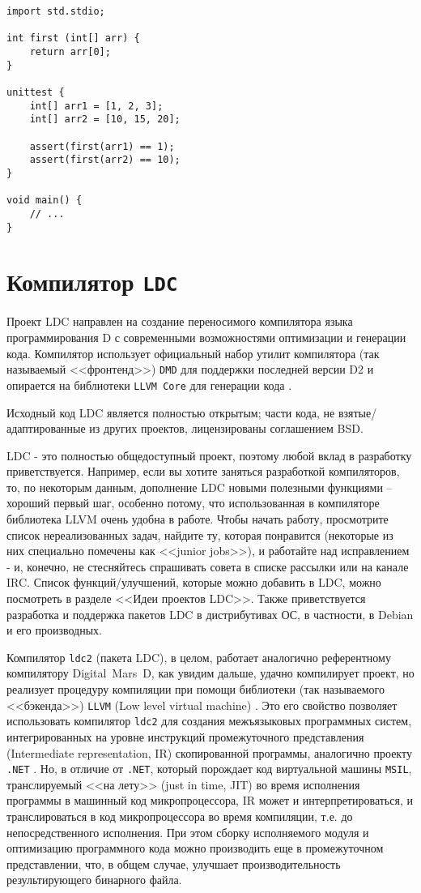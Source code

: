 \documentclass{studrep}
\begin{document}
\begin{verbatim}
import std.stdio;

int first (int[] arr) {
    return arr[0];
}

unittest {
    int[] arr1 = [1, 2, 3];
    int[] arr2 = [10, 15, 20];

    assert(first(arr1) == 1);
    assert(first(arr2) == 10);
}

void main() {
    // ...
}
\end{verbatim}

\section{Компилятор \texttt{LDC}}

Проект LDC направлен на создание переносимого компилятора языка программирования D с современными возможностями оптимизации и генерации кода. Компилятор использует официальный набор утилит компилятора (так называемый <<фронтенд>>) \texttt{DMD} для поддержки последней версии D2 и опирается на библиотеки \texttt{LLVM Core} для генерации кода \cite{ldcwiki}.

Исходный код LDC является полностью открытым; части кода, не взятые/адаптированные из других проектов, лицензированы соглашением BSD.

LDC - это полностью общедоступный проект, поэтому любой вклад в разработку приветствуется. Например, если вы хотите заняться разработкой компиляторов, то, по некоторым данным, дополнение LDC новыми полезными функциями -- хороший первый шаг, особенно потому, что использованная в компиляторе библиотека LLVM очень удобна в работе. Чтобы начать работу, просмотрите список нереализованных задач, найдите ту, которая понравится (некоторые из них специально помечены как <<junior jobs>>), и работайте над исправлением - и, конечно, не стесняйтесь спрашивать совета в списке рассылки или на канале IRC. Список функций/улучшений, которые можно добавить в LDC, можно посмотреть в разделе <<Идеи проектов LDC>>. Также приветствуется разработка и поддержка пакетов LDC в дистрибутивах ОС, в частности, в Debian и его производных.

Компилятор \texttt{ldc2} (пакета LDC), в целом, работает аналогично референтному компилятору Digital~Mars~D, как увидим дальше, удачно компилирует проект, но реализует процедуру компиляции при помощи библиотеки (так называемого <<бэкенда>>) \texttt{LLVM} (Low level virtual machine) \cite{llvm}.  Это его свойство позволяет использовать компилятор \texttt{ldc2} для создания межъязыковых программных систем, интегрированных на уровне инструкций промежуточного представления (Intermediate representation, IR) скопированной программы, аналогично проекту \texttt{.NET} \cite{dotnet}.  Но, в отличие от \texttt{.NET}, который порождает код виртуальной машины \texttt{MSIL}, транслируемый <<на лету>> (just in time, JIT) во время исполнения программы в машинный код микропроцессора, IR может и интерпретироваться, и транслироваться в код микропроцессора во время компиляции, т.е. до непосредственного исполнения.  При этом сборку исполняемого модуля и оптимизацию программного кода можно производить еще в промежуточном представлении, что, в общем случае, улучшает производительность результирующего бинарного файла.
\end{document}

